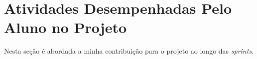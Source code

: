 \section[Atividades Desempenhadas Pelo Aluno no Projeto]{Atividades Desempenhadas Pelo Aluno no Projeto}

Nesta seção é abordada a minha contribuição para o projeto ao longo das \textit{sprints}.






